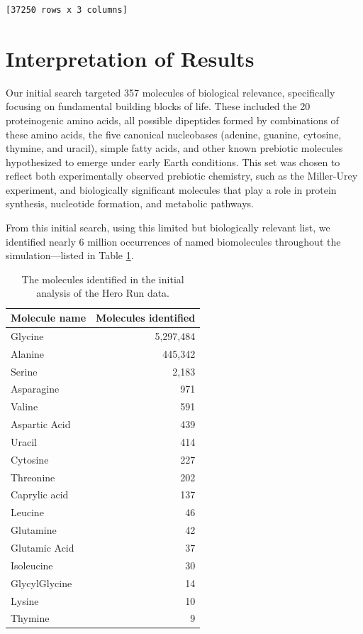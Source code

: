 \begin{verbatim}
[37250 rows x 3 columns]
\end{verbatim}

\section{Interpretation of Results}
\label{sec:hero_run_interpretation}

Our initial search targeted 357 molecules of biological relevance, specifically focusing on fundamental building blocks of life. These included the 20 proteinogenic amino acids, all possible dipeptides formed by combinations of these amino acids, the five canonical nucleobases (adenine, guanine, cytosine, thymine, and uracil), simple fatty acids, and other known prebiotic molecules hypothesized to emerge under early Earth conditions. This set was chosen to reflect both experimentally observed prebiotic chemistry, such as the Miller-Urey experiment, and biologically significant molecules that play a role in protein synthesis, nucleotide formation, and metabolic pathways.

From this initial search, using this limited but biologically relevant list, we identified nearly 6 million occurrences of named biomolecules throughout the simulation---listed in Table \ref{tab:inital_molfind_counts}. 

\begin{table}[hb]
    \centering
    \begin{tabularx}{3in}{Xr}
        \toprule
        Molecule name & Molecules identified \\
        \midrule
        Glycine & 5,297,484 \\
        Alanine & 445,342 \\
        Serine & 2,183 \\
        Asparagine & 971 \\
        Valine & 591 \\
        Aspartic Acid & 439 \\
        Uracil & 414 \\
        Cytosine & 227 \\
        Threonine & 202 \\
        Caprylic acid & 137 \\
        Leucine & 46 \\
        Glutamine & 42 \\
        Glutamic Acid & 37 \\
        Isoleucine & 30 \\
        GlycylGlycine & 14 \\
        Lysine & 10 \\
        Thymine & 9 \\
        \bottomrule
    \end{tabularx}
    \caption[Initial Early Earth molfind search]{The molecules identified in the initial analysis of the Hero Run data.}
    \label{tab:inital_molfind_counts}
\end{table}

